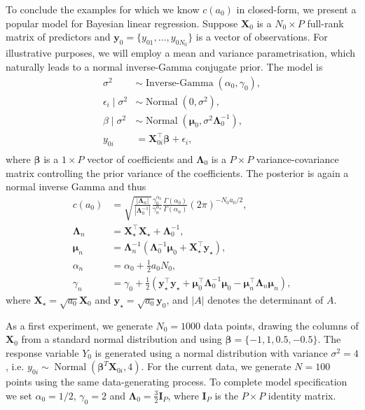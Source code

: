 \documentclass[a4paper, notitlepage, 11pt]{article}
\begin{document}
To conclude the examples for which we know $c(a_0)$ in closed-form, we present a popular model for Bayesian linear regression.
Suppose $\boldsymbol X_0$ is a $N_0 \times P$ full-rank matrix of predictors and $\boldsymbol y_0 = \{y_{01}, \ldots, y_{0N_0} \}$ is a vector of observations.
For illustrative purposes, we will employ a mean and variance parametrisation, which naturally leads to a normal inverse-Gamma conjugate prior.
The model is 
\begin{align*}
 \sigma^2 &\sim \operatorname{Inverse-Gamma}(\alpha_0, \gamma_0),\\
 \epsilon_i \mid \sigma^2  &\sim \operatorname{Normal}(0, \sigma^2), \\
 \beta \mid \sigma^2 &\sim \operatorname{Normal}(\boldsymbol \mu_0, \sigma^2\boldsymbol\Lambda_0^{-1}),\\
 y_{0i} &= \boldsymbol X_{0i}^\top \boldsymbol\beta + \epsilon_i, \\
\end{align*} 
where $\boldsymbol\beta$ is a $ 1 \times P$ vector of coefficients and $\boldsymbol\Lambda_0$ is a $P \times P$ variance-covariance matrix controlling the prior variance of the coefficients.
The posterior is again a normal inverse Gamma and thus
\begin{align}
 \label{eq:cA0_regression}
c(a_0) &= \sqrt{\frac{|\boldsymbol\Lambda_n|}{|\boldsymbol\Lambda_0^{-1}|}} \frac{\gamma_0^{\alpha_0}}{\gamma_n^{\alpha_n}}\frac{\Gamma(\alpha_0)}{\Gamma(\alpha_n)}  (2\pi)^{-N_0 a_0/2},\\
\nonumber
\boldsymbol\Lambda_n &= \boldsymbol X_{\star}^\top\boldsymbol X_{\star} + \boldsymbol \Lambda_0^{-1}, \\
\nonumber
\boldsymbol\mu_n &= \boldsymbol\Lambda_n^{-1}\left(\boldsymbol\Lambda_0^{-1}\boldsymbol\mu_0 + \boldsymbol X_{\star}^\top\boldsymbol y_{\star} \right),  \\
\nonumber
\alpha_n &= \alpha_0 + \frac{1}{2}a_0N_0,\\
\nonumber
\gamma_n &= \gamma_0 + \frac{1}{2}\left( \boldsymbol y_{\star}^\top \boldsymbol y_{\star} + \boldsymbol \mu_0^\top \boldsymbol \Lambda_0^{-1} \boldsymbol \mu_0 - \boldsymbol\mu_n^\top \boldsymbol \Lambda_n \boldsymbol \mu_n  \right),
\end{align}
where $\boldsymbol X_{\star} = \sqrt{a_0} \boldsymbol X_0$ and $\boldsymbol y_{\star} = \sqrt{a_0} \boldsymbol y_0$, and $|A|$ denotes the determinant of $A$.

As a first experiment, we generate $N_0 = 1000$ data points, drawing the columns of $\boldsymbol X_0$ from a standard normal distribution and using $\boldsymbol \beta = \{ -1, 1, 0.5, -0.5\}$.
The response variable $Y_0$ is generated using a normal distribution with variance $\sigma^2 = 4$, i.e. $y_{0i} \sim \operatorname{Normal}(\boldsymbol\beta^T \boldsymbol X_{0i}, 4)$.
For the current data, we generate $N = 100$ points using the same data-generating process.
To complete model specification we set $\alpha_0 = 1/2$, $\gamma_0 = 2$ and $\boldsymbol\Lambda_0 = \frac{3}{2}\boldsymbol I_P$, where $\boldsymbol I_P$ is the $P \times P$ identity matrix.
\end{document}
